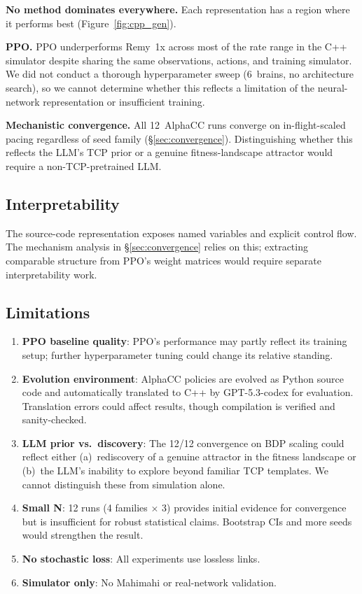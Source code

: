 \textbf{No method dominates everywhere.} Each representation has
a region where it performs best (Figure~\ref{fig:cpp_gen}).

\textbf{PPO.} PPO underperforms Remy~1x across most of the rate range
in the C++ simulator despite sharing the same observations,
actions, and training simulator. We did not conduct a thorough
hyperparameter sweep (6~brains, no architecture search), so we cannot
determine whether this reflects a limitation of the
neural-network representation or insufficient training.

\textbf{Mechanistic convergence.} All 12~AlphaCC runs converge on
in-flight-scaled pacing regardless of seed family
(\S\ref{sec:convergence}). Distinguishing whether this reflects the
LLM's TCP prior or a genuine fitness-landscape attractor would
require a non-TCP-pretrained LLM.

\subsection{Interpretability}

The source-code representation exposes named variables and explicit
control flow. The mechanism analysis in
\S\ref{sec:convergence} relies on this; extracting comparable structure
from PPO's weight matrices would require separate
interpretability work.

\subsection{Limitations}

\begin{enumerate}
\item \textbf{PPO baseline quality}: PPO's performance may partly
  reflect its training setup; further hyperparameter tuning could change
  its relative standing.
\item \textbf{Evolution environment}: AlphaCC policies are evolved
  as Python source code and automatically translated to C++ by
  GPT-5.3-codex for evaluation. Translation errors could affect
  results, though compilation is verified and sanity-checked.
\item \textbf{LLM prior vs.\ discovery}: The 12/12 convergence on BDP scaling
  could reflect either (a)~rediscovery of a genuine attractor in the fitness
  landscape or (b)~the LLM's inability to explore beyond familiar TCP
  templates. We cannot distinguish these from simulation alone.
\item \textbf{Small N}: 12 runs (4 families $\times$ 3) provides
  initial evidence for convergence but is insufficient for robust statistical
  claims. Bootstrap CIs and more seeds would strengthen the result.
\item \textbf{No stochastic loss}: All experiments use lossless links.
\item \textbf{Simulator only}: No Mahimahi or real-network validation.

\end{enumerate}





